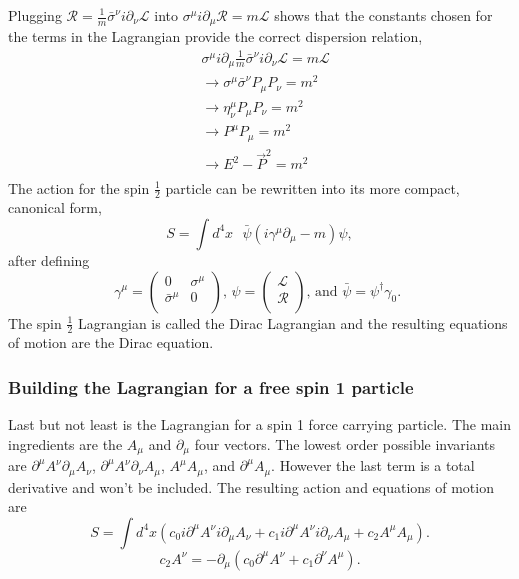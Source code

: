 Plugging $\mathcal{R} = \frac{1}{m}\bar{\sigma}^\nu i\partial_\nu\mathcal{L}$ into $\sigma^\mu i\partial_\mu\mathcal{R} = m\mathcal{L}$ shows that the constants chosen for the terms in the Lagrangian provide the correct dispersion relation,
\begin{equation}
\begin{split}
&\sigma^\mu i\partial_\mu \frac{1}{m}\bar{\sigma}^\nu i\partial_\nu\mathcal{L} = m\mathcal{L} \\
&\rightarrow \sigma^\mu \bar{\sigma}^\nu P_\mu P_\nu = m^2 \\
&\rightarrow \eta^\mu_\nu P_\mu P_\nu = m^2 \\
&\rightarrow P^\mu P_\mu = m^2 \\
&\rightarrow E^2 - \vec{P}^2 = m^2 \\
\end{split}
\end{equation}
The action for the spin $\frac{1}{2}$ particle can be rewritten into its more compact, canonical form,
\begin{equation}
S = \int d^4x \text{ } \bar{\psi} \left(i\gamma^\mu\partial_\mu - m\right)\psi,
\end{equation} 
after defining
\begin{equation}
\gamma^\mu =
\begin{pmatrix}
0 & \sigma^\mu \\
\bar{\sigma}^\mu & 0 \\
\end{pmatrix}
\text{, } 
\psi =
\begin{pmatrix}
\mathcal{L} \\
\mathcal{R} \\
\end{pmatrix}
\text{, and } 
\bar{\psi} =
\psi^\dagger \gamma_0 \text{. }
\end{equation}
The spin $\frac{1}{2}$ Lagrangian is called the Dirac Lagrangian and the resulting equations of motion are the Dirac equation.

\subsubsection{Building the Lagrangian for a free spin 1 particle}
Last but not least is the Lagrangian for a spin 1 force carrying particle. The main ingredients are the $A_\mu$ and $\partial_\mu$ four vectors. The lowest order possible invariants are $\partial^\mu A^\nu\partial_\mu A_\nu$, $\partial^\mu A^\nu\partial_\nu A_\mu$, $A^\mu A_\mu$, and $\partial^\mu A_\mu$. However the last term is a total derivative and won't be included. The resulting action and equations of motion are 
\begin{equation}
S = \int d^4x \left( c_0 i\partial^\mu A^\nu i\partial_\mu A_\nu + c_1 i\partial^\mu A^\nu i\partial_\nu A_\mu + c_2 A^\mu A_\mu \right).
\end{equation}
\begin{equation}
c_2 A^\nu = -\partial_\mu\left(c_0 \partial^\mu A^\nu + c_1 \partial^\nu A^\mu\right).
\end{equation}

